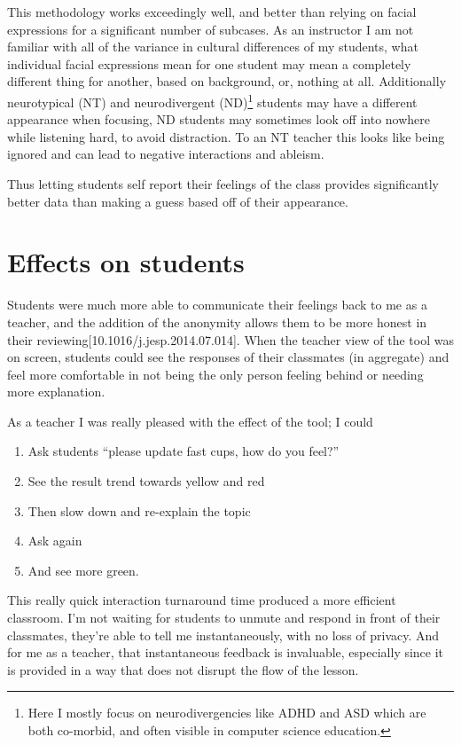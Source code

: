 \documentclass[paper=a4,justified,a4paper]{tufte-handout}
\providecommand{\tightlist}{%
  \setlength{\itemsep}{0pt}\setlength{\parskip}{0pt}}
\begin{document}
This methodology works exceedingly well, and better than relying on
facial expressions for a significant number of subcases. As an
instructor I am not familiar with all of the variance in cultural
differences of my students, what individual facial expressions mean for
one student may mean a completely different thing for another, based on
background, or, nothing at all. Additionally neurotypical (NT) and
neurodivergent
(ND)\footnote{Here I mostly focus on neurodivergencies like ADHD and ASD which are both co-morbid, and often visible in computer science education.}
students may have a different appearance when focusing, ND students may
sometimes look off into nowhere while listening hard, to avoid
distraction. To an NT teacher this looks like being ignored and can lead
to negative interactions and ableism\cite{10.1007/s10734-020-00513-6}.

Thus letting students self report their feelings of the class provides
significantly better data than making a guess based off of their
appearance.

\hypertarget{effects-on-students}{%
\section{Effects on students}\label{effects-on-students}}

Students were much more able to communicate their feelings back to me as
a teacher, and the addition of the anonymity allows them to be more
honest in their reviewing{[}10.1016/j.jesp.2014.07.014{]}. When the
teacher view of the tool was on screen, students could see the responses
of their classmates (in aggregate) and feel more comfortable in not
being the only person feeling behind or needing more explanation.

As a teacher I was really pleased with the effect of the tool; I could

\begin{enumerate}
\def\labelenumi{\arabic{enumi}.}
\tightlist
\item
  Ask students ``please update fast cups, how do you feel?''
\item
  See the result trend towards yellow and red
\item
  Then slow down and re-explain the topic
\item
  Ask again
\item
  And see more green.
\end{enumerate}

This really quick interaction turnaround time produced a more efficient
classroom. I'm not waiting for students to unmute and respond in front
of their classmates, they're able to tell me instantaneously, with no
loss of privacy. And for me as a teacher, that instantaneous feedback is
invaluable, especially since it is provided in a way that does not
disrupt the flow of the lesson.
\end{document}
